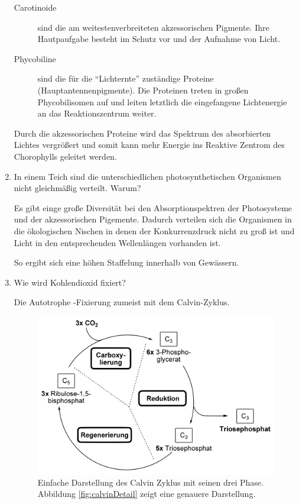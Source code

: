 \begin{enumerate}
		\begin{description}
			\item[Carotinoide]
				sind die am weitestenverbreiteten akzessorischen Pigmente.
				Ihre Hautpaufgabe besteht im Schutz vor und der Aufnahme von Licht.
			\item[Phycobiline] 
				sind die für die ``Lichternte'' zuständige Proteine (Hauptantennenpigmente).
				Die Proteinen treten in großen Phycobilisomen auf und leiten letztlich die
				eingefangene Lichtenergie an das Reaktionszentrum weiter.
		\end{description}

		Durch die akzessorischen Proteine wird das Spektrum des absorbierten Lichtes vergrößert
		und somit kann mehr Energie ins Reaktive Zentrom des Chorophylls geleitet werden.

	\item In einem Teich sind die unterschiedlichen photosynthetischen Organismen nicht gleichmäßig verteilt. Warum?

		Es gibt einge große Diversität bei den Absorptionspektren der Photosysteme
		und der akzessorischen Pigemente.
		Dadurch verteilen sich die Organismen in die ökologischen Nischen
		in denen der Konkurrenzdruck nicht zu groß ist
		und Licht in den entsprechenden Wellenlängen vorhanden ist.

		So ergibt sich eine höhen Staffelung innerhalb von Gewässern.

	\item Wie wird Kohlendioxid fixiert?

		Die Autotrophe -Fixierung zumeist mit dem Calvin-Zyklus.
		
		\begin{figure}[ht!]
		\leavevmode
		\begin{center}
		\includegraphics[scale=0.33]{./pictures/calvin_simple_1000}
		\end{center}
		\caption{Einfache Darstellung des Calvin Zyklus mit seinen drei Phase. 
		Abbildung \ref{fig:calvinDetail} zeigt eine genauere Darstellung.}
		\label{fig:calvinSimple}
		\end{figure}


\end{enumerate}
